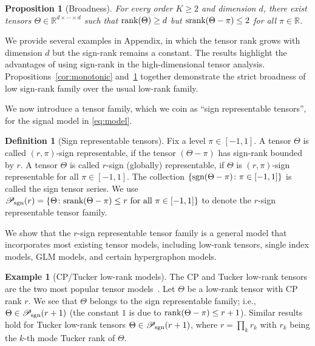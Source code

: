 \documentclass[11pt]{article}
\theoremstyle{plain}
\newtheorem{prop}{Proposition}
\theoremstyle{definition}
\newtheorem{defn}{Definition}
\newtheorem{example}{Example}
\def\sign{\textup{sgn}}
\def\srank{\textup{srank}}
\def\rank{\textup{rank}}
\def\caliP{\mathscr{P}_{\textup{sgn}}}
\begin{document}
\begin{prop}[Broadness]\label{prop:extention}\label{cor:broadness}For every order $K\geq 2$ and dimension $d$, there exist tensors $\Theta\in\mathbb{R}^{d\times \cdots \times d}$ such that $\rank(\Theta)\geq d$ but $\srank(\Theta-\pi)\leq 2$ for all $\pi\in\mathbb{R}$.  
\end{prop}
We provide several examples in Appendix, in which the tensor rank grows with dimension $d$ but the sign-rank remains a constant. The results highlight the advantages of using sign-rank in the high-dimensional tensor analysis. Propositions~\ref{cor:monotonic} and~\ref{prop:extention} together demonstrate the strict broadness of low sign-rank family over the usual low-rank family. 

We now introduce a tensor family, which we coin as ``sign representable tensors'', for the signal model in \eqref{eq:model}.\\
\begin{defn}[Sign representable tensors] 
Fix a level $\pi\in[-1,1]$. A tensor $\Theta$ is called $(r,\pi)$-sign representable, if the tensor $(\Theta-\pi)$ has sign-rank bounded by $r$. A tensor $\Theta$ is called $r$-sign (globally) representable, if $\Theta$ is $(r,\pi)$-sign representable for all $\pi\in[-1,1]$. The collection $\{\sign(\Theta-\pi)\colon \pi \in[-1,1]\}$ is called the sign tensor series. 
We use $\caliP(r)=\{\Theta\colon \srank(\Theta-\pi)\leq r \text{ for all }\pi\in[-1,1]\}$ to denote the $r$-sign representable tensor family.
\end{defn}

We show that the $r$-sign representable tensor family is a general model that incorporates most existing tensor models, including low-rank tensors, single index models, GLM models, and certain hypergraphon models. \\

\begin{example}[CP/Tucker low-rank models] The CP and Tucker low-rank tensors are the two most popular tensor models~\citep{kolda2009tensor}. Let $\Theta$ be a low-rank tensor with CP rank $r$. We see that $\Theta$ belongs to the sign representable family; i.e., $\Theta\in\caliP(r+1)$ (the constant $1$ is due to $\rank(\Theta-\pi)\leq r+1$). Similar results hold for Tucker low-rank tensors $\Theta\in\caliP(r+1)$, where $r=\prod_kr_k$ with $r_k$ being the $k$-th mode Tucker rank of $\Theta$.  \\
\end{example} 
\end{document}
